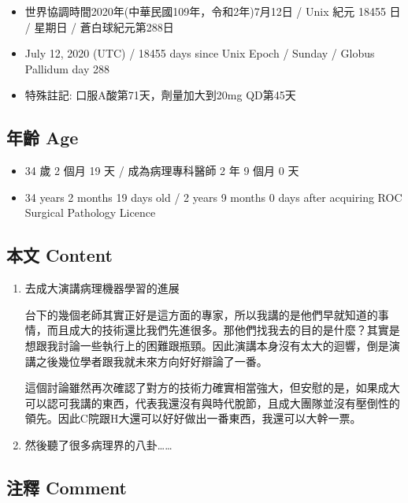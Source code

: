 \documentclass[
]{article}
\providecommand{\tightlist}{%
  \setlength{\itemsep}{0pt}\setlength{\parskip}{0pt}}
\begin{document}
\begin{itemize}
\tightlist
\item
  世界協調時間2020年(中華民國109年，令和2年)7月12日 / Unix 紀元 18455 日
  / 星期日 / 蒼白球紀元第288日
\item
  July 12, 2020 (UTC) / 18455 days since Unix Epoch / Sunday / Globus
  Pallidum day 288
\item
  特殊註記: 口服A酸第71天，劑量加大到20mg QD第45天
\end{itemize}

\hypertarget{ux5e74ux9f61-age-10}{%
\subsection{年齡 Age}\label{ux5e74ux9f61-age-10}}

\begin{itemize}
\tightlist
\item
  34 歲 2 個月 19 天 / 成為病理專科醫師 2 年 9 個月 0 天
\item
  34 years 2 months 19 days old / 2 years 9 months 0 days after
  acquiring ROC Surgical Pathology Licence
\end{itemize}

\hypertarget{ux672cux6587-content-10}{%
\subsection{本文 Content}\label{ux672cux6587-content-10}}

\begin{enumerate}
\def\labelenumi{\arabic{enumi}.}
\item
  去成大演講病理機器學習的進展

  台下的幾個老師其實正好是這方面的專家，所以我講的是他們早就知道的事情，而且成大的技術還比我們先進很多。那他們找我去的目的是什麼？其實是想跟我討論一些執行上的困難跟瓶頸。因此演講本身沒有太大的迴響，倒是演講之後幾位學者跟我就未來方向好好辯論了一番。

  這個討論雖然再次確認了對方的技術力確實相當強大，但安慰的是，如果成大可以認可我講的東西，代表我還沒有與時代脫節，且成大團隊並沒有壓倒性的領先。因此C院跟H大還可以好好做出一番東西，我還可以大幹一票。
\item
  然後聽了很多病理界的八卦\ldots\ldots{}
\end{enumerate}

\hypertarget{ux6ce8ux91cb-comment-10}{%
\subsection{注釋 Comment}\label{ux6ce8ux91cb-comment-10}}
\end{document}
